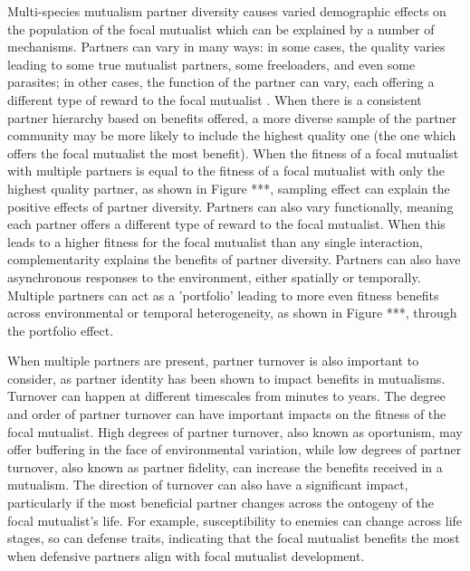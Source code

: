 \documentclass[12pt,a4paper]{article}
\begin{document}
Multi-species mutualism partner diversity causes varied demographic effects on the population of the focal mutualist which can be explained by a number of mechanisms.
Partners can vary in many ways: in some cases, the quality varies leading to some true mutualist partners, some freeloaders, and even some parasites\cite{Bronstein1994,Bronstein2001a,Afkhami2014,Song2020,West2007,Frederickson2013,Jones2015}; in other cases, the function of the partner can vary, each offering a different type of reward to the focal mutualist \cite{Stanton2003}.
When there is a consistent partner hierarchy based on benefits offered, a more diverse sample of the partner community may be more likely to include the highest quality one\cite{Frederickson2013} (the one which offers the focal mutualist the most benefit).
When the fitness of a focal mutualist with multiple partners is equal to the fitness of a focal mutualist with only the highest quality partner, as shown in Figure ***, sampling effect can explain the positive effects of partner diversity\cite{Batstone2018}. 
Partners can also vary functionally, meaning each partner offers a different type of reward to the focal mutualist\cite{Stachowicz2005,Bronstein2006,Stanton2003}.
When this leads to a higher fitness for the focal mutualist than any single interaction, complementarity explains the benefits of partner diversity\cite{Batstone2018}. 
Partners can also have asynchronous responses to the environment, either spatially\cite{Ollerton2006} or temporally\cite{Alarcon2008}.
Multiple partners can act as a 'portfolio' leading to more even fitness benefits across environmental or temporal heterogeneity, as shown in Figure ***, through the portfolio effect\cite{Batstone2018,Lazaro2022}.

When multiple partners are present, partner turnover is also important to consider, as partner identity has been shown to impact benefits in mutualisms\cite{Djieto-Lordon2005}. 
Turnover can happen at different timescales\cite{Oliveira1999,Horvitz1986} from minutes to years. 
The degree and order of partner turnover can have important impacts on the fitness of the focal mutualist.
High degrees of partner turnover, also known as oportunism, may offer buffering in the face of environmental variation\cite{Hegland2009}, while low degrees of partner turnover, also known as partner fidelity, can increase the benefits received in a mutualism\cite{Sachs2004}.
The direction of turnover can also have a significant impact, particularly if the most beneficial partner changes across the ontogeny of the focal mutualist's life\cite{Fonseca2003}.
For example, susceptibility to enemies can change across life stages\cite{Boege2005,Barton2010}, so can defense traits, indicating that the focal mutualist benefits the most when defensive partners align with focal mutualist development\cite{Djieto-Lordon2005}. 
\end{document}
